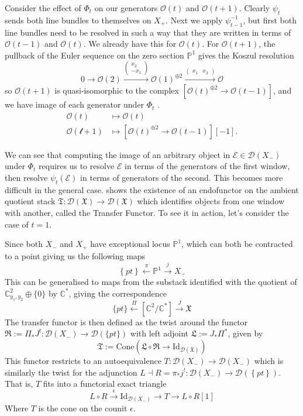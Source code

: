 Consider the effect of $\Phi_t$ on our generators $\mathcal{O}(t)$ and $\mathcal{O}(t+1)$. Clearly $\psi_t$ sends both line bundles to themselves on $X_{+}$. Next we apply $\psi_{t-1}^{-1}$, but first both line bundles need to be resolved in such a way that they are written in terms of $\mathcal{O}(t-1)$ and $\mathcal{O}(t)$. We already have this for $\mathcal{O}(t)$. For $\mathcal{O}(t+1)$, the pullback of the Euler sequence on the zero section $\mathbb{P}^1$ gives the Koszul resolution $$
 0\to \mathcal{O}(2)\xrightarrow{\begin{pmatrix}x_2\\-x_{1}\end{pmatrix}}\mathcal{O}(1)^{\oplus 2}\xrightarrow{\begin{pmatrix}x_{1}&x_2\end{pmatrix}} \mathcal{O}
$$so $\mathcal{O}(t+1)$ is quasi-isomorphic to the complex $\left[ \mathcal{O}(t)^{\oplus{2}}\to \mathcal{O}(t-1) \right]$, and we have image of each generator under $\Phi_t$ . 
\begin{align*}
\mathcal{O}(t) &\mapsto \mathcal{O}(t)\\
\mathcal{\mathcal{O}(t+1)}&\mapsto\left[ \mathcal{O}(t)^{\oplus 2}\to \mathcal{O}(t-1) \right][-1] .
\end{align*}

We can see that computing the image of an arbitrary object in $\mathcal{E} \in \mathcal{D}(X_-)$ under $\Phi_t$ requires us to resolve $\mathcal{E}$ in terms of the generators of the first window, then resolve $\psi_{t}(\mathcal{E})$ in terms of generators of the second. This becomes more difficult in the general case.  \cite{donovan_window_2014} shows the existence of an endofunctor on the ambient quotient stack $\mathfrak{T}: \mathcal{D}(\mathfrak{X})\to \mathcal{D}(\mathfrak{X})$ which identifies objects from one window with another, called the Transfer Functor. To see it in action, let's consider the case of $t = 1$.

Since both $X_-$ and $X_+$ have exceptional locus $\mathbb{P}^1$, which can both be contracted to a point giving us the following maps $$
\left\{ pt \right\} \xleftarrow{\pi} \mathbb{P}^{1}\xrightarrow{j} X_{-}
$$
This can be generalised to maps from the substack identified with the quotient of $\mathbb{C}^{2}_{y_{1}, y_{2}} \oplus \{ 0 \}$ by $\mathbb{C}^*$, giving the correspondence $$
\{ pt \}\xleftarrow{\Pi}[\mathbb{C}^{2}/\mathbb{C}^*] \xrightarrow{J} \mathfrak{X}
$$
The transfer functor is then defined as the twist around the functor $\mathfrak{R}:= \Pi_{*}J^{!}: \mathcal{D}(X_{-})\to \mathcal{D}(\{ pt \})$  with left adjoint $\mathfrak{L}:= J_{*}\Pi^{*}$, given by $$
\mathfrak{T}:= \mathrm{Cone}\left(\mathfrak{L}\circ \mathfrak{R} \to \mathrm{Id}_{\mathcal{D}(\mathfrak{X})} \right) 
$$
This functor restricts to an autoequivalence $T: \mathcal{D}(X_{-})\to \mathcal{D}(X_-)$ which is similarly the twist for the adjunction $L\dashv R= \pi_{*}j^{!} : \mathcal{D}(X_{-})\to \mathcal{D}(\left\{ pt \right\})$. That is, $T$ fits into a functorial exact triangle $$
L\circ R \xrightarrow{\epsilon} \mathrm{Id}_{\mathcal{D}(X_{-})} \to T\to L\circ R[1]
$$Where $T$ is the cone on the counit $\epsilon$. 


